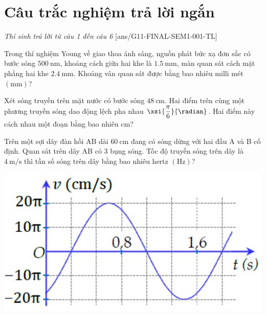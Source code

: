 \section{Câu trắc nghiệm trả lời ngắn} \textit{Thí sinh trả lời từ câu 1 đến câu 6}
\setcounter{ex}{0}
[ans/G11-FINAL-SEM1-001-TL]
\begin{ex}
Trong thí nghiệm Young về giao thoa ánh sáng, nguồn phát bức xạ đơn sắc có bước sóng $\SI{500}{\nano\meter}$, khoảng cách giữa hai khe là $\SI{1.5}{\milli\meter}$, màn quan sát cách mặt phẳng hai khe $\SI{2.4}{\milli\meter}$. Khoảng vân quan sát được bằng bao nhiêu milli mét $\left(\si{\milli\meter}\right)$? 
\end{ex}
\begin{ex}
Xét sóng truyền trên mặt nước có bước sóng $\SI{48}{\centi\meter}$. Hai điểm trên cùng một phương truyền sóng dao động lệch pha nhau $\xsi{\dfrac{\pi}{6}}{\radian}$. Hai điểm này cách nhau một đoạn bằng bao nhiêu $\si{\centi\meter}$?
\end{ex}
\begin{ex}
Trên một sợi dây đàn hồi AB dài $\SI{60}{\centi\meter}$ đang có sóng dừng với hai đầu A và B cố định. Quan sát trên dây AB có 3 bụng sóng. Tốc độ truyền sóng trên dây là $\SI{4}{\meter/\second}$ thì tần số sóng trên dây bằng bao nhiêu hertz $\left(\si{\hertz}\right)$? 
\end{ex}
\begin{ex}
	{\vspace{-0.5cm}\includegraphics[scale=0.5]{../figs/G11-FINAL-SEM1-001-4}}
\end{ex}
